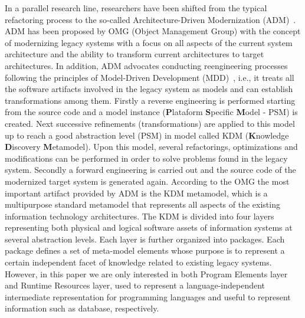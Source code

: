 In a parallel research line, researchers have been shifted from the typical refactoring process to the so-called Architecture-Driven Modernization (ADM)~\cite{Ulrich:2010}. ADM has been proposed by OMG (Object Management Group) with the concept of modernizing legacy systems with a focus on all aspects of the current system architecture and the ability to transform current architectures to target architectures. In addition, ADM advocates conducting reengineering processes following the principles of Model-Driven Development (MDD)~\cite{Ulrich:2010:IST:1841736}, i.e., it treats all the software artifacts involved in the legacy system as models and can establish transformations among them.  Firstly a reverse engineering is performed starting from the source code and a model instance (\textbf{P}lataform \textbf{S}pecific \textbf{M}odel - PSM) is created. Next successive refinements (transformations) are applied to this model up to reach a good abstraction level (PSM) in model called KDM (\textbf{K}nowledge \textbf{D}iscovery \textbf{M}etamodel). Upon this model, several refactorings, optimizations and modifications can be performed in order to solve problems found in the legacy system. Secondly a forward engineering is carried out and the source code of the modernized target system is generated again. According to the OMG the most important artifact provided by ADM is the KDM metamodel, which is a multipurpose standard metamodel that represents all aspects of the existing information  technology architectures. The KDM is divided into four layers representing both physical and logical software assets of information systems at several abstraction levels. Each layer is further organized into packages. Each package defines a set of meta-model elements whose purpose is to represent a certain independent facet of knowledge related to existing legacy systems.  However, in this paper we are only interested in both Program Elements layer and Runtime Resources layer, used to represent a language-independent intermediate representation for programming languages and useful to represent information such as database, respectively.

